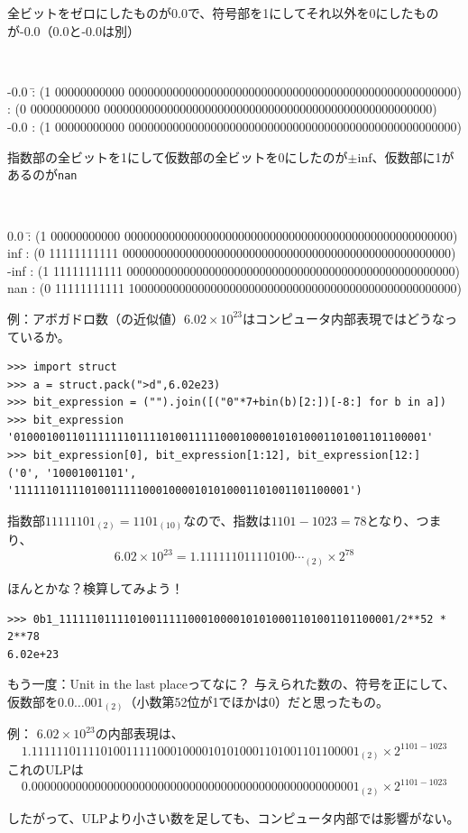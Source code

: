 \documentclass[unicode,lualatex,aspectratio=169]{beamer}
\begin{document}
\begin{frame}[fragile]
全ビットをゼロにしたものが0.0で、符号部を1にしてそれ以外を0にしたものが-0.0（0.0と-0.0は別）

{\tiny\tt
\begin{tabbing}
    -0.0 \=: (1 00000000000 0000000000000000000000000000000000000000000000000000) \>: (0 00000000000 0000000000000000000000000000000000000000000000000000)\\
    -0.0 \>: (1 00000000000 0000000000000000000000000000000000000000000000000000)
  \end{tabbing}
}
指数部の全ビットを1にして仮数部の全ビットを0にしたのが$\pm\text{inf}$、仮数部に1があるのが{\tt nan}
{\tiny\tt
\begin{tabbing}
    0.0 \=: (1 00000000000 0000000000000000000000000000000000000000000000000000)\kill
    inf \>: (0 11111111111 0000000000000000000000000000000000000000000000000000)\\
    -inf \>: (1 11111111111 0000000000000000000000000000000000000000000000000000)\\
    nan \>: (0 11111111111 1000000000000000000000000000000000000000000000000000)
  \end{tabbing}
}


\end{frame}
\begin{frame}[fragile]
  例：アボガドロ数（の近似値）$6.02\times 10^{23}$はコンピュータ内部表現ではどうなっているか。
{\fontsize{6pt}{6pt}\selectfont
\begin{verbatim}
>>> import struct
>>> a = struct.pack(">d",6.02e23) 
>>> bit_expression = ("").join([("0"*7+bin(b)[2:])[-8:] for b in a])
>>> bit_expression
'0100010011011111110111101001111100010000101010001101001101100001'
>>> bit_expression[0], bit_expression[1:12], bit_expression[12:]
('0', '10001001101', '1111110111101001111100010000101010001101001101100001')
\end{verbatim}
}
指数部$11111101_{(2)}=1101_{(10)}$なので、指数は$1101-1023=78$となり、つまり、
\[
  6.02\times 10^{23} = 1.111111011110100\cdots_{(2)} \times 2^{78}
\]

ほんとかな？検算してみよう！
{\fontsize{6pt}{6pt}\selectfont    
\begin{verbatim}
>>> 0b1_1111110111101001111100010000101010001101001101100001/2**52 * 2**78
6.02e+23
\end{verbatim}
}
\end{frame}
\begin{frame}[fragile]{もう一度：Unit in the last placeってなに？}
  与えられた数の、符号を正にして、仮数部を$0.0\dots 001_{(2)}$（小数第52位が1でほかは0）だと思ったもの。

  
  例：
  $6.02\times 10^{23}$の内部表現は、
  {\tiny \[\mathtt{1.1111110111101001111100010000101010001101001101100001}_{(2)} \times 2^{1101-1023}\]}
  これのULPは
  {\tiny \[\mathtt{0.0000000000000000000000000000000000000000000000000001}_{(2)} \times 2^{1101-1023}\]}

  したがって、ULPより小さい数を足しても、コンピュータ内部では影響がない。
\end{frame}
\end{document}
